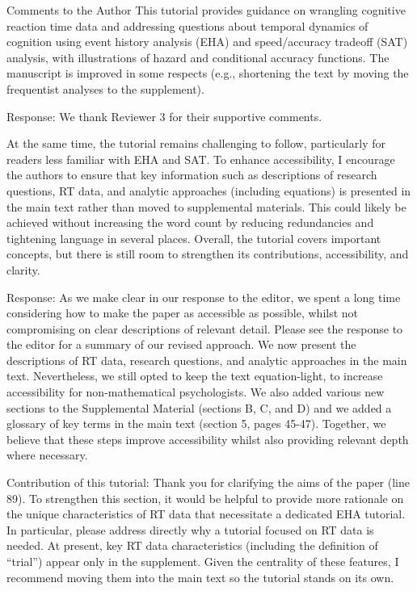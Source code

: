 \documentclass[
]{article}
\renewenvironment{quote}{\begin{leftbar}}{\end{leftbar}}
\begin{document}
\begin{quote}
Comments to the Author This tutorial provides guidance on wrangling
cognitive reaction time data and addressing questions about temporal
dynamics of cognition using event history analysis (EHA) and
speed/accuracy tradeoff (SAT) analysis, with illustrations of hazard and
conditional accuracy functions. The manuscript is improved in some
respects (e.g., shortening the text by moving the frequentist analyses
to the supplement).
\end{quote}

Response: We thank Reviewer 3 for their supportive comments.

\begin{quote}
At the same time, the tutorial remains challenging to follow,
particularly for readers less familiar with EHA and SAT. To enhance
accessibility, I encourage the authors to ensure that key information
such as descriptions of research questions, RT data, and analytic
approaches (including equations) is presented in the main text rather
than moved to supplemental materials. This could likely be achieved
without increasing the word count by reducing redundancies and
tightening language in several places. Overall, the tutorial covers
important concepts, but there is still room to strengthen its
contributions, accessibility, and clarity.
\end{quote}

Response: As we make clear in our response to the editor, we spent a
long time considering how to make the paper as accessible as possible,
whilst not compromising on clear descriptions of relevant detail. Please
see the response to the editor for a summary of our revised approach. We
now present the descriptions of RT data, research questions, and
analytic approaches in the main text. Nevertheless, we still opted to
keep the text equation-light, to increase accessibility for
non-mathematical psychologists. We also added various new sections to
the Supplemental Material (sections B, C, and D) and we added a glossary
of key terms in the main text (section 5, pages 45-47). Together, we
believe that these steps improve accessibility whilst also providing
relevant depth where necessary.

\begin{quote}
Contribution of this tutorial: Thank you for clarifying the aims of the
paper (line 89). To strengthen this section, it would be helpful to
provide more rationale on the unique characteristics of RT data that
necessitate a dedicated EHA tutorial. In particular, please address
directly why a tutorial focused on RT data is needed. At present, key RT
data characteristics (including the definition of ``trial'') appear only
in the supplement. Given the centrality of these features, I recommend
moving them into the main text so the tutorial stands on its own.
\end{quote}
\end{document}
